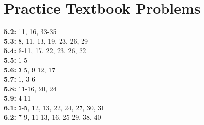\documentclass[11pt]{article}
\begin{document}
\section*{Practice Textbook Problems}
\textbf{5.2:} 11, 16, 33-35 \\ 
\textbf{5.3:} 8, 11, 13, 19, 23, 26, 29 \\ 
\textbf{5.4:} 8-11, 17, 22, 23, 26, 32 \\ 
\textbf{5.5:} 1-5 \\ 
\textbf{5.6:} 3-5, 9-12, 17 \\ 
\textbf{5.7:} 1, 3-6 \\ 
\textbf{5.8:} 11-16, 20, 24 \\ 
\textbf{5.9:} 4-11 \\ 
\textbf{6.1:} 3-5, 12, 13, 22, 24, 27, 30, 31 \\ 
\textbf{6.2:} 7-9, 11-13, 16, 25-29, 38, 40 \\ 
\end{document}
